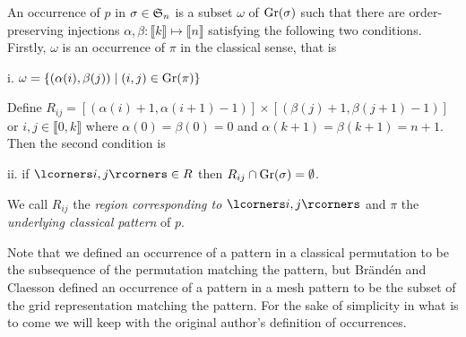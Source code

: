 \begin{definition}
  An occurrence of $p$ in $\sigma \in \S_n$ is a subset $\omega$ of 
  $\Gr{\sigma}$ such that there are order-preserving injections $\alpha, \beta 
  \colon \llbracket k \rrbracket \mapsto \llbracket n \rrbracket$ satisfying the 
  following two conditions. Firstly, $\omega$ is an occurrence of $\pi$ in the 
  classical sense, that is

    i. $\omega = \left\{ \left( \alpha(i), \beta(j) \right) \mid (i, j) \in \Gr{\pi} \right\}$

  \noindent
  Define $R_{ij} = \left[ \left( \alpha(i) + 1, \alpha(i + 1) - 1 \right) 
  \right] \times \left[ \left( \beta(j) + 1, \beta(j + 1) - 1 \right) \right]$ 
  or $i,j \in \llbracket 0, k \rrbracket$ where $\alpha(0) = \beta(0) = 0$ and 
  $\alpha(k + 1) = \beta(k + 1) = n + 1$. Then the second condition is

    ii. if $\boks{i, j} \in R$ then $R_{ij} \cap \Gr{\sigma} = \emptyset$.

  \noindent
  We call $R_{ij}$ the \emph{region corresponding to} $\boks{i,j}$ and $\pi$ 
  the \emph{underlying classical pattern} of $p$.
\end{definition}

Note that we defined an occurrence of a pattern in a classical permutation to be 
the subsequence of the permutation matching the pattern, but Brändén and 
Claesson defined an occurrence of a pattern in a mesh pattern to be the subset 
of the grid representation matching the pattern. For the sake of simplicity in 
what is to come we will keep with the original author's definition of 
occurrences.

